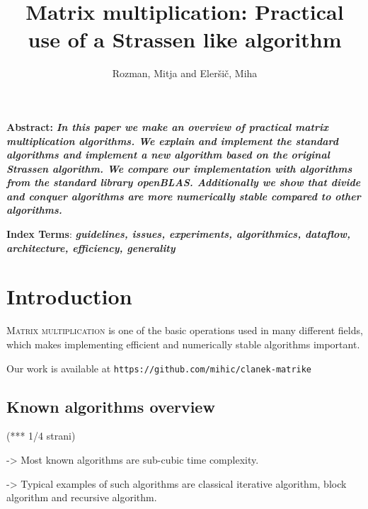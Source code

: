 \documentclass[a4paper,11pt]{article}
\title{Matrix multiplication: Practical use of a Strassen like algorithm}
\author{Rozman, Mitja and Eleršič, Miha}
\date{}
\renewenvironment{abstract}
{\begin{spacing}{1}\small\textbf{Abstract:}\bfseries\itshape}
{\end{spacing}}
\begin{document}
\maketitle



\begingroup
\renewcommand\thefootnote{}
\endgroup

\begin{abstract} %
In this paper we make an overview of practical matrix multiplication algorithms.
We explain and implement the standard algorithms and implement a new algorithm based on the original Strassen algorithm.
We compare our implementation with algorithms from the standard library openBLAS. Additionally we show that divide and conquer algorithms are more numerically stable compared to other algorithms.
\end{abstract}
\vspace{0.5cm}
\begin{spacing}{0.9}
\small\textbf{Index Terms}: \textbf{\textit{guidelines, issues, experiments, algorithmics, dataflow, architecture, efficiency, generality}}
\end{spacing}


\section{Introduction}

\lettrine{M}{atrix multiplication} 
is one of the basic operations used in many different fields, which makes implementing efficient and numerically stable algorithms important. 

Our work is available at \texttt{https://github.com/mihic/clanek-matrike}


\subsection{Known algorithms overview}
(*** 1/4 strani)

->
Most known algorithms are sub-cubic time complexity.

->
Typical examples of such algorithms are 
classical iterative algorithm, block algorithm 
and recursive algorithm.
\end{document}

